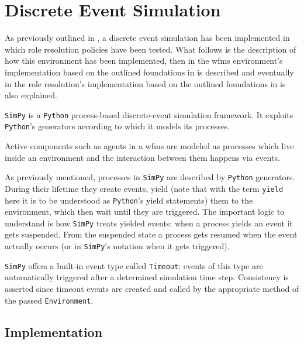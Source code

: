 \chapter{Discrete Event Simulation}
\label{ch:discrete_event_sim}

As previously outlined in , a discrete event simulation has been implemented in which role resolution policies have been tested. What follows is the description of how this environment has been implemented, then in  the \gls{wfms} environment's implementation based on the outlined foundations in  is described and eventually in  the role resolution's implementation based on the outlined foundations in  is also explained.

\texttt{SimPy} is a \texttt{Python} process-based discrete-event simulation framework. It exploits \texttt{Python}'s generators according to which it models its processes.

Active components such as agents in a \gls{wfms} are modeled as processes which live inside an environment and the interaction between them happens via events.

As previously mentioned, processes in \texttt{SimPy} are described by \texttt{Python} generators. During their lifetime they create events, yield (note that with the term \texttt{yield} here it is to be understood as \texttt{Python}'s yield statements) them to the environment, which then wait until they are triggered. The important logic to understand is how \texttt{SimPy} treats yielded events: when a process yields an event it gets suspended. From the suspended state a process gets resumed when the event actually occurs (or in \texttt{SimPy}'s notation when it gets triggered).

\texttt{SimPy} offers a built-in event type called \texttt{Timeout}: events of this type are automatically triggered after a determined simulation time step. Consistency is asserted since timeout events are created and called by the appropriate method of the passed \texttt{Environment}.

\section{ Implementation}
\label{sec:bpmn_implementation}


